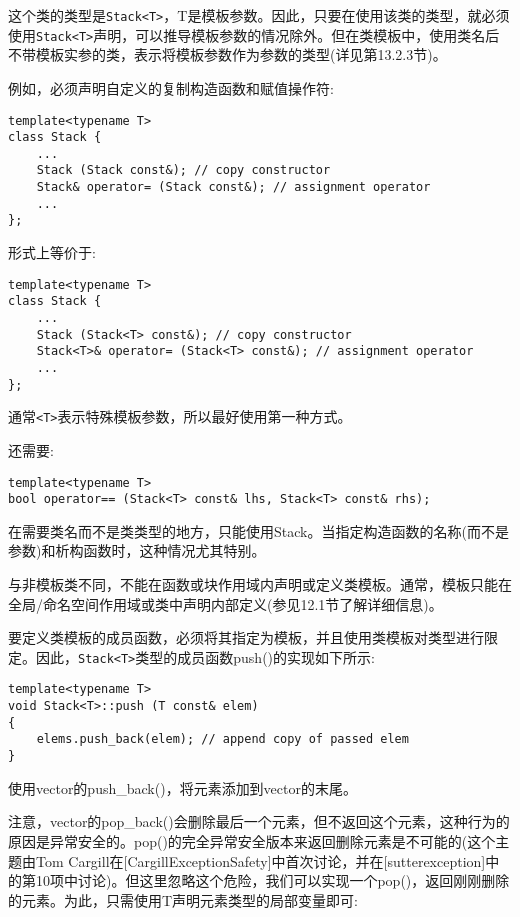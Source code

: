 这个类的类型是\texttt{Stack<T>}，T是模板参数。因此，只要在使用该类的类型，就必须使用\texttt{Stack<T>}声明，可以推导模板参数的情况除外。但在类模板中，使用类名后不带模板实参的类，表示将模板参数作为参数的类型(详见第13.2.3节)。

例如，必须声明自定义的复制构造函数和赋值操作符:

\begin{lstlisting}[style=styleCXX]
template<typename T>
class Stack {
	...
	Stack (Stack const&); // copy constructor
	Stack& operator= (Stack const&); // assignment operator
	...
};
\end{lstlisting}

形式上等价于:

\begin{lstlisting}[style=styleCXX]
template<typename T>
class Stack {
	...
	Stack (Stack<T> const&); // copy constructor
	Stack<T>& operator= (Stack<T> const&); // assignment operator
	...
};
\end{lstlisting}

通常\texttt{<T>}表示特殊模板参数，所以最好使用第一种方式。

还需要:

\begin{lstlisting}[style=styleCXX]
template<typename T>
bool operator== (Stack<T> const& lhs, Stack<T> const& rhs);
\end{lstlisting}

在需要类名而不是类类型的地方，只能使用Stack。当指定构造函数的名称(而不是参数)和析构函数时，这种情况尤其特别。

与非模板类不同，不能在函数或块作用域内声明或定义类模板。通常，模板只能在全局/命名空间作用域或类中声明内部定义(参见12.1节了解详细信息)。


要定义类模板的成员函数，必须将其指定为模板，并且使用类模板对类型进行限定。因此，\texttt{Stack<T>}类型的成员函数push()的实现如下所示:

\begin{lstlisting}[style=styleCXX]
template<typename T>
void Stack<T>::push (T const& elem)
{
	elems.push_back(elem); // append copy of passed elem
}
\end{lstlisting}

使用vector的push\_back()，将元素添加到vector的末尾。

注意，vector的pop\_back()会删除最后一个元素，但不返回这个元素，这种行为的原因是异常安全的。pop()的完全异常安全版本来返回删除元素是不可能的(这个主题由Tom Cargill在[CargillExceptionSafety]中首次讨论，并在[sutterexception]中的第10项中讨论)。但这里忽略这个危险，我们可以实现一个pop()，返回刚刚删除的元素。为此，只需使用T声明元素类型的局部变量即可:

